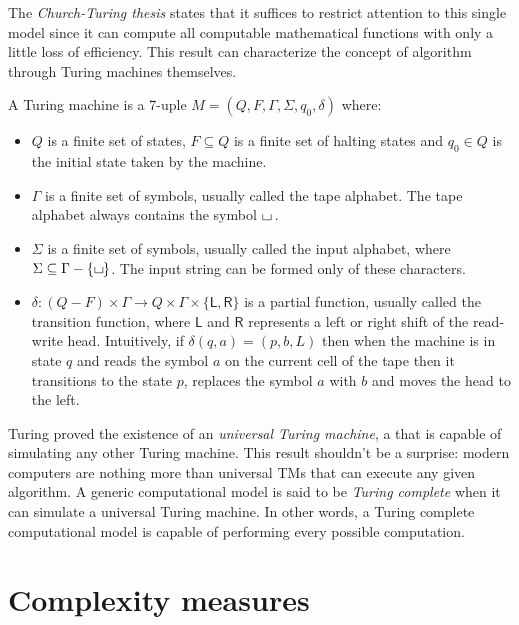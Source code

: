 The \textit{Church-Turing thesis} states that it suffices to restrict attention to this single model since it can compute all computable mathematical functions with only a little loss of efficiency. This result can characterize the concept of algorithm through Turing machines themselves. \cite{complexity_arora_barak}

\begin{definition}
 A Turing machine is a 7-uple $M = (Q, F, \Gamma, \Sigma, q_0, \delta)$ where:
    \begin{itemize}
        \item $Q$ is a finite set of states, $F \subseteq Q$ is a finite set of halting states and $q_0 \in Q$ is the initial state taken by the machine.
        \item $\Gamma$ is a finite set of symbols, usually called the tape alphabet. The tape alphabet always contains the symbol $\blankchar\,$.
        \item $\Sigma$ is a finite set of symbols, usually called the input alphabet, where $\Sigma \subseteq \Gamma - \{\blankchar\}$. The input string can be formed only of these characters.
        \item $\delta : (Q - F) \times \Gamma \to Q \times \Gamma \times \{\mathsf{L}, \mathsf{R}\}$ is a partial function, usually called the transition function, where $\mathsf{L}$ and $\mathsf{R}$ represents a left or right shift of the read-write head. Intuitively, if $\delta(q, a) = (p, b, L)$ then when the machine is in state $q$ and reads the symbol $a$ on the current cell of the tape then it transitions to the state $p$, replaces the symbol $a$ with $b$ and moves the head to the left.
    \end{itemize}
\end{definition}

Turing proved the existence of an \textit{universal Turing machine}, a \TM that is capable of simulating any other Turing machine. This result shouldn't be a surprise: modern computers are nothing more than universal \textsf{TM}s that can execute any given algorithm. A generic computational model is said to be \textit{Turing complete} when it can simulate a universal Turing machine. In other words, a Turing complete computational model is capable of performing every possible computation.

\newpage

\section{Complexity measures}

